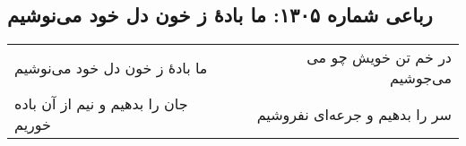 \begin{center}
\section*{رباعی شماره ۱۳۰۵: ما بادهٔ ز خون دل خود می‌نوشیم}
\label{sec:1305}
\begin{longtable}{l p{0.5cm} r}
ما بادهٔ ز خون دل خود می‌نوشیم
&&
در خم تن خویش چو می می‌جوشیم
\\
جان را بدهیم و نیم از آن باده خوریم
&&
سر را بدهیم و جرعه‌ای نفروشیم
\\
\end{longtable}
\end{center}

